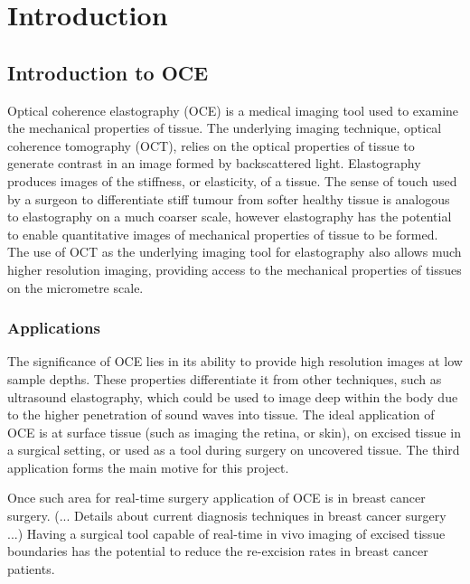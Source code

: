 \chapter{Introduction}

\section{Introduction to OCE}
Optical coherence elastography (OCE) is a medical imaging tool used to examine the mechanical properties of tissue. The underlying imaging technique, optical coherence tomography (OCT), relies on the optical properties of tissue to generate contrast in an image formed by backscattered light. Elastography produces images of the stiffness, or elasticity, of a tissue. The sense of touch used by a surgeon to differentiate stiff tumour from softer healthy tissue is analogous to elastography on a much coarser scale, however elastography has the potential to enable quantitative images of mechanical properties of tissue to be formed. The use of OCT as the underlying imaging tool for elastography also allows much higher resolution imaging, providing access to the mechanical properties of tissues on the micrometre scale. 

\subsection{Applications}
The significance of OCE lies in its ability to provide high resolution images at low sample depths. These properties differentiate it from other techniques, such as ultrasound elastography, which could be used to image deep within the body due to the higher penetration of sound waves into tissue. The ideal application of OCE is at surface tissue (such as imaging the retina, or skin), on excised tissue in a surgical setting, or used as a tool during surgery on uncovered tissue. The third application forms the main motive for this project.

Once such area for real-time surgery application of OCE is in breast cancer surgery. (... Details about current diagnosis techniques in breast cancer surgery ...) Having a surgical tool capable of real-time in vivo imaging of excised tissue boundaries has the potential to reduce the re-excision rates in breast cancer patients.

